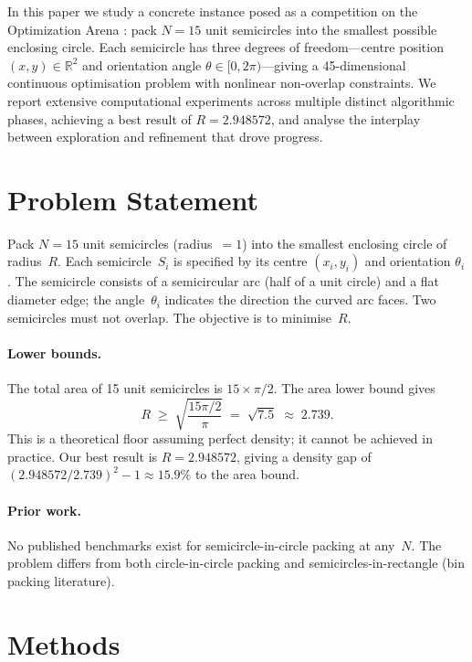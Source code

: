 \documentclass[11pt]{article}
\begin{document}
In this paper we study a concrete instance posed as a competition on the Optimization Arena \citep{optimizationarena2026}: pack $N=15$ unit semicircles into the smallest possible enclosing circle.
Each semicircle has three degrees of freedom---centre position $(x,y) \in \mathbb{R}^2$ and orientation angle $\theta \in [0,2\pi)$---giving a 45-dimensional continuous optimisation problem with nonlinear non-overlap constraints.
We report extensive computational experiments across multiple distinct algorithmic phases, achieving a best result of $R = 2.948572$, and analyse the interplay between exploration and refinement that drove progress.

\section{Problem Statement}
\label{sec:problem}

Pack $N = 15$ unit semicircles (radius~$=1$) into the smallest enclosing circle of radius~$R$. Each semicircle~$S_i$ is specified by its centre $(x_i, y_i)$ and orientation $\theta_i$. The semicircle consists of a semicircular arc (half of a unit circle) and a flat diameter edge; the angle~$\theta_i$ indicates the direction the curved arc faces. Two semicircles must not overlap. The objective is to minimise~$R$.

\paragraph{Lower bounds.}
The total area of 15 unit semicircles is $15 \times \pi/2$. The area lower bound gives
\[
  R \;\ge\; \sqrt{\frac{15\pi/2}{\pi}} \;=\; \sqrt{7.5} \;\approx\; 2.739.
\]
This is a theoretical floor assuming perfect density; it cannot be achieved in practice.
Our best result is $R = 2.948572$, giving a density gap of $(2.948572/2.739)^2 - 1 \approx 15.9\%$ to the area bound.

\paragraph{Prior work.}
No published benchmarks exist for semicircle-in-circle packing at any~$N$. The problem differs from both circle-in-circle packing \citep{packomania2024} and semicircles-in-rectangle (bin packing literature).

\section{Methods}
\label{sec:methods}
\end{document}
